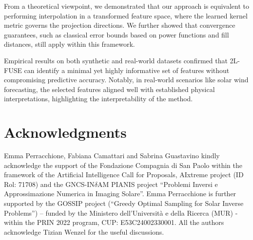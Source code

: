 \documentclass[hyphens,a4paper,11pt]{article}
\begin{document}
From a theoretical viewpoint, we demonstrated that our approach is equivalent to performing interpolation in a transformed feature space, where the learned kernel metric governs the projection directions. We further showed that convergence guarantees, such as classical error bounds based on power functions and fill distances, still apply within this framework.

Empirical results on both synthetic and real-world datasets confirmed that 2L-FUSE can identify a minimal yet highly informative set of features without compromising predictive accuracy. Notably, in real-world scenarios like solar wind forecasting, the selected features aligned well with established physical interpretations, highlighting the interpretability of the method.


\section*{Acknowledgments}
Emma Perracchione, Fabiana Camattari and Sabrina Guastavino kindly acknowledge the support of the Fondazione Compagnia di San Paolo within the framework of the Artificial Intelligence Call for Proposals, AIxtreme project (ID Rol: 71708) and the GNCS-IN$\delta$AM PIANIS project ``Problemi Inversi e Approssimazione Numerica in Imaging Solare''. Emma Perracchione is further supported by the GOSSIP project (``Greedy Optimal Sampling for Solar Inverse Problems'') – funded by the Ministero dell’Universit\`a e della Ricerca (MUR) -  within the PRIN 2022 program, CUP: E53C24002330001. All the authors acknowledge Tizian Wenzel for the useful discussions.
\end{document}
